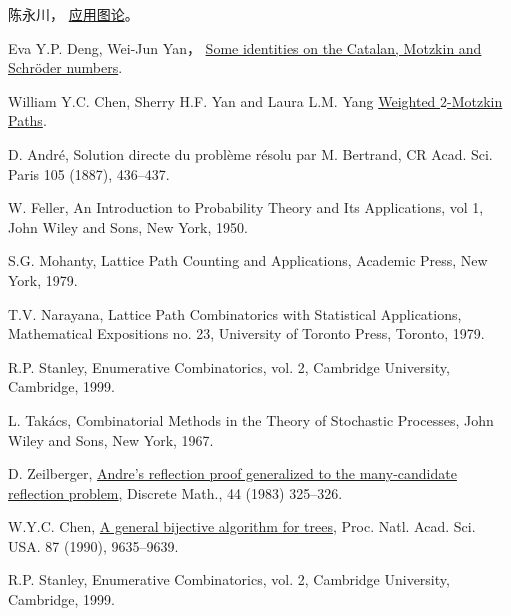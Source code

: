 \begin{thebibliography}{99}


 陈永川，
\href{ref/motzkin.pdf}{应用图论}。

Eva Y.P. Deng, Wei-Jun Yan，
\href{ref/sdarticle.pdf}{Some identities on the Catalan, Motzkin and Schr\"{o}der numbers}.

William Y.C. Chen, Sherry H.F. Yan and Laura L.M. Yang
\href{ref/chen.pdf}{Weighted $2$-Motzkin Paths}.



 D. Andr\'e,
Solution directe du probl\`eme r\'esolu par M. Bertrand, CR Acad.
Sci. Paris 105 (1887), 436--437.



 W. Feller,
An Introduction to Probability Theory and Its Applications, vol 1,
John Wiley and Sons, New York, 1950.


 S.G. Mohanty, Lattice Path Counting and Applications,
Academic Press, New York, 1979.

 T.V. Narayana,
Lattice Path Combinatorics with Statistical Applications,
Mathematical Expositions no. 23, University of Toronto Press,
Toronto, 1979.

 R.P. Stanley,
Enumerative Combinatorics, vol. 2, Cambridge University, Cambridge,
1999.

 L. Tak\'acs,
Combinatorial Methods in the Theory of Stochastic Processes, John
Wiley and Sons, New York, 1967.

 D. Zeilberger, \href{Andre's reflection proof generalized to the
many-candidate reflection problem.pdf}{Andre's reflection proof
generalized to the many-candidate reflection problem}, Discrete
Math., 44 (1983) 325--326.

 W.Y.C. Chen,
\href{ref/A general bijective algorithm for trees.pdf}{A general
bijective algorithm for trees}, Proc. Natl. Acad. Sci. USA. 87
(1990), 9635--9639.

 R.P. Stanley,
Enumerative Combinatorics, vol. 2, Cambridge University, Cambridge,
1999.

\end{thebibliography}

